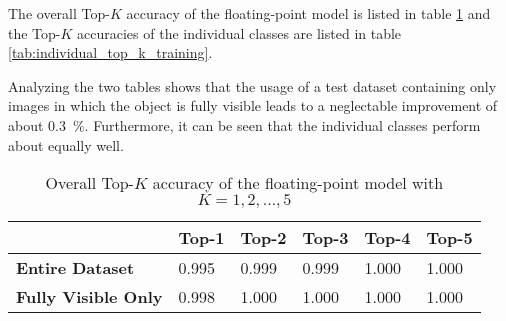 The overall Top-$K$ accuracy of the floating-point model is listed in table \ref{tab:overall_top_k_training} and the Top-$K$ accuracies of the individual classes are listed in table \ref{tab:individual_top_k_training}.

Analyzing the two tables shows that the usage of a test dataset containing only images in which the object is fully visible leads to a neglectable improvement of about \SI{0.3}{\percent}.
Furthermore, it can be seen that the individual classes perform about equally well.

\begin{table}[b]
  \caption{Overall Top-$K$ accuracy of the floating-point model with $K = 1, 2, \dots, 5$}
  \label{tab:overall_top_k_training}
  \centering
  \begin{tabular}{llllll}
    \toprule
     & \textbf{Top-1} & \textbf{Top-2} & \textbf{Top-3} & \textbf{Top-4} & \textbf{Top-5} \\
    \midrule
    \textbf{Entire Dataset} & \num{0.995} & \num{0.999} & \num{0.999} & \num{1.000} & \num{1.000} \\
    \textbf{Fully Visible Only} & \num{0.998} & \num{1.000} & \num{1.000} & \num{1.000} & \num{1.000} \\ %
    \bottomrule
  \end{tabular}
\end{table}

